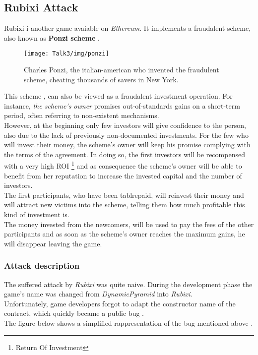 \subsection{Rubixi Attack}
Rubixi \cite{rubixi1, rubixi2} i another game avaiable on \textit{Ethereum}. It implements a fraudalent scheme, also known as \textbf{Ponzi scheme} \cite{paper2}. \\


\begin{figure}[H]
\begin{center}
\texttt{[image: Talk3/img/ponzi]}
\end{center}
\caption{Charles Ponzi, the italian-american who invented the fraudulent scheme,  cheating thousands of savers in New York.}
\label{label}
\end{figure}





This scheme \cite{ponzi}, can also be viewed as a fraudalent investment operation. For instance, \textit{the scheme's owner} promises out-of-standards gains on a short-term period, often referring to non-existent mechanisms. \\ 
However, at the beginning only few investors will give confidence to the person, also due to the lack of previously non-documented investments. 
For the few who will invest their money, the scheme's owner will keep his promise complying with the terms of the agreement. In doing so, the first investors will be recompensed with a very high ROI \footnote{Return Of Investment} and as consequence the scheme's owner will be able to benefit from her reputation to increase the invested capital and the number of investors. \\
The first participants, who have been tablrepaid, will reinvest their money and will attract new victims into the scheme, telling them how much profitable this kind of investment is. \\
The money invested from the newcomers, will be used to pay the fees of the other participants and as soon as the scheme's owner reaches the maximum gains, he will disappear leaving the game. \\
\subsubsection{Attack description}
The suffered attack by \textit{Rubixi} was quite naive. During the development phase the game's name was changed from \textit{DynamicPyramid} into \textit{Rubixi}. \\
Unfortunately, game developers forgot to adapt the constructor name of the contract, which quickly became a public bug \cite{paper2}. \\
The figure below shows a simplified rappresentation of the bug mentioned above \cite{paper2}.

